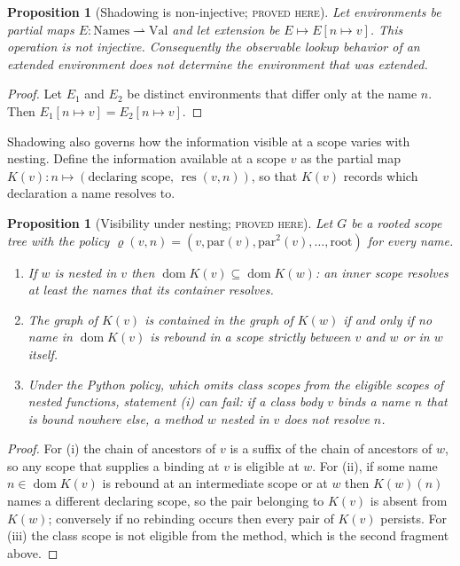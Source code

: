 \documentclass[11pt]{article}
\newtheorem{proposition}[theorem]{Proposition}
\theoremstyle{definition}
\theoremstyle{remark}
\newcommand{\stN}{\textsc{proved here}}
\newcommand{\res}{\operatorname{res}}
\newcommand{\dom}{\operatorname{dom}}
\newcommand{\pfn}{\rightharpoonup}
\begin{document}
\begin{proposition}[Shadowing is non-injective; \stN]\label{prop:shadow}
Let environments be partial maps $E:\mathrm{Names}\pfn\mathrm{Val}$ and let extension be $E\mapsto E[n\mapsto v]$. This operation is not injective. Consequently the observable lookup behavior of an extended environment does not determine the environment that was extended.
\end{proposition}
\begin{proof}
Let $E_1$ and $E_2$ be distinct environments that differ only at the name $n$. Then $E_1[n\mapsto v]=E_2[n\mapsto v]$.
\end{proof}

Shadowing also governs how the information visible at a scope varies with nesting. Define the information available at a scope $v$ as the partial map $K(v):n\mapsto(\text{declaring scope},\,\res(v,n))$, so that $K(v)$ records which declaration a name resolves to.

\begin{proposition}[Visibility under nesting; \stN]\label{prop:visibility}
Let $G$ be a rooted scope tree with the policy $\varrho(v,n)=(v,\mathrm{par}(v),\mathrm{par}^2(v),\dots,\mathrm{root})$ for every name.
\begin{enumerate}[label=(\roman*)]
\item If $w$ is nested in $v$ then $\dom K(v)\subseteq\dom K(w)$: an inner scope resolves at least the names that its container resolves.
\item The graph of $K(v)$ is contained in the graph of $K(w)$ if and only if no name in $\dom K(v)$ is rebound in a scope strictly between $v$ and $w$ or in $w$ itself.
\item Under the Python policy, which omits class scopes from the eligible scopes of nested functions, statement (i) can fail: if a class body $v$ binds a name $n$ that is bound nowhere else, a method $w$ nested in $v$ does not resolve $n$.
\end{enumerate}
\end{proposition}
\begin{proof}
For (i) the chain of ancestors of $v$ is a suffix of the chain of ancestors of $w$, so any scope that supplies a binding at $v$ is eligible at $w$. For (ii), if some name $n\in\dom K(v)$ is rebound at an intermediate scope or at $w$ then $K(w)(n)$ names a different declaring scope, so the pair belonging to $K(v)$ is absent from $K(w)$; conversely if no rebinding occurs then every pair of $K(v)$ persists. For (iii) the class scope is not eligible from the method, which is the second fragment above.
\end{proof}
\end{document}
